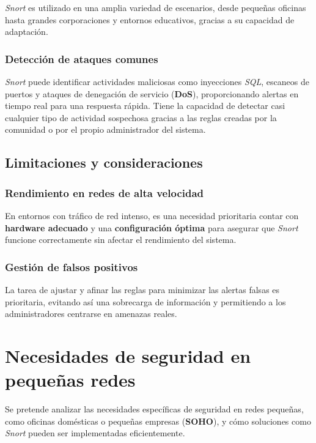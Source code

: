 \documentclass[11pt,a4paper,twoside]{report}
\begin{document}
\textit{Snort} es utilizado en una amplia variedad de escenarios, desde pequeñas oficinas hasta grandes corporaciones y entornos educativos, gracias a su capacidad de adaptación.


\subsubsection{Detección de ataques comunes}

\textit{Snort} puede identificar actividades maliciosas como inyecciones \textit{SQL}, escaneos de puertos y ataques de denegación de servicio (\textbf{DoS}), proporcionando alertas en tiempo real para una respuesta rápida. Tiene la capacidad de detectar casi cualquier tipo de actividad sospechosa gracias a las reglas creadas por la comunidad o por el propio administrador del sistema.

\subsection{Limitaciones y consideraciones}

\subsubsection{Rendimiento en redes de alta velocidad}

En entornos con tráfico de red intenso, es una necesidad prioritaria contar con \textbf{hardware adecuado} y una \textbf{configuración óptima} para asegurar que \textit{Snort} funcione correctamente sin afectar el rendimiento del sistema.

\subsubsection{Gestión de falsos positivos}

La tarea de ajustar y afinar las reglas para minimizar las alertas falsas es prioritaria, evitando así una sobrecarga de información y permitiendo a los administradores centrarse en amenazas reales.

\section{Necesidades de seguridad en pequeñas redes}

Se pretende analizar las necesidades específicas de seguridad en redes pequeñas, como oficinas domésticas o pequeñas empresas (\textbf{SOHO}), y cómo soluciones como \textit{Snort} pueden ser implementadas eficientemente.
\end{document}
